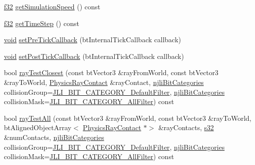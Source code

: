 \begin{DoxyCompactItemize}
\item 
\mbox{\hyperlink{_util_8h_a5f6906312a689f27d70e9d086649d3fd}{f32}} \mbox{\hyperlink{classnjli_1_1_physics_world_a9ea8ef8cac36b815fa7431bd7fbdd045}{get\+Simulation\+Speed}} () const
\item 
\mbox{\hyperlink{_util_8h_a5f6906312a689f27d70e9d086649d3fd}{f32}} \mbox{\hyperlink{classnjli_1_1_physics_world_ae347ecd60cf40a997e712bf0ff51f3f8}{get\+Time\+Step}} () const
\item 
\mbox{\hyperlink{_thread_8h_af1e856da2e658414cb2456cb6f7ebc66}{void}} \mbox{\hyperlink{classnjli_1_1_physics_world_a0fc4b0b757a0fa74f289a9186e26fc5d}{set\+Pre\+Tick\+Callback}} (bt\+Internal\+Tick\+Callback callback)
\item 
\mbox{\hyperlink{_thread_8h_af1e856da2e658414cb2456cb6f7ebc66}{void}} \mbox{\hyperlink{classnjli_1_1_physics_world_a727d1fa784603c527fd210a6b9950842}{set\+Post\+Tick\+Callback}} (bt\+Internal\+Tick\+Callback callback)
\item 
bool \mbox{\hyperlink{classnjli_1_1_physics_world_a3b7a0136977fba6c34da2c3b8b598536}{ray\+Test\+Closest}} (const bt\+Vector3 \&ray\+From\+World, const bt\+Vector3 \&ray\+To\+World, \mbox{\hyperlink{classnjli_1_1_physics_ray_contact}{Physics\+Ray\+Contact}} \&ray\+Contact, \mbox{\hyperlink{namespacenjli_af7b302a2b48bb644f85c88080925c974}{njli\+Bit\+Categories}} collision\+Group=\mbox{\hyperlink{namespacenjli_af7b302a2b48bb644f85c88080925c974a53b33337014e199f56e752574f36981e}{J\+L\+I\+\_\+\+B\+I\+T\+\_\+\+C\+A\+T\+E\+G\+O\+R\+Y\+\_\+\+Default\+Filter}}, \mbox{\hyperlink{namespacenjli_af7b302a2b48bb644f85c88080925c974}{njli\+Bit\+Categories}} collision\+Mask=\mbox{\hyperlink{namespacenjli_af7b302a2b48bb644f85c88080925c974a0fba80cad161dda96de5cbda9091cdce}{J\+L\+I\+\_\+\+B\+I\+T\+\_\+\+C\+A\+T\+E\+G\+O\+R\+Y\+\_\+\+All\+Filter}}) const
\item 
bool \mbox{\hyperlink{classnjli_1_1_physics_world_a211942b503f8a7d2932504a2c7e5ac66}{ray\+Test\+All}} (const bt\+Vector3 \&ray\+From\+World, const bt\+Vector3 \&ray\+To\+World, bt\+Aligned\+Object\+Array$<$ \mbox{\hyperlink{classnjli_1_1_physics_ray_contact}{Physics\+Ray\+Contact}} $\ast$$>$ \&ray\+Contacts, \mbox{\hyperlink{_util_8h_aa62c75d314a0d1f37f79c4b73b2292e2}{s32}} \&num\+Contacts, \mbox{\hyperlink{namespacenjli_af7b302a2b48bb644f85c88080925c974}{njli\+Bit\+Categories}} collision\+Group=\mbox{\hyperlink{namespacenjli_af7b302a2b48bb644f85c88080925c974a53b33337014e199f56e752574f36981e}{J\+L\+I\+\_\+\+B\+I\+T\+\_\+\+C\+A\+T\+E\+G\+O\+R\+Y\+\_\+\+Default\+Filter}}, \mbox{\hyperlink{namespacenjli_af7b302a2b48bb644f85c88080925c974}{njli\+Bit\+Categories}} collision\+Mask=\mbox{\hyperlink{namespacenjli_af7b302a2b48bb644f85c88080925c974a0fba80cad161dda96de5cbda9091cdce}{J\+L\+I\+\_\+\+B\+I\+T\+\_\+\+C\+A\+T\+E\+G\+O\+R\+Y\+\_\+\+All\+Filter}}) const
$$
\end{DoxyCompactItemize}
